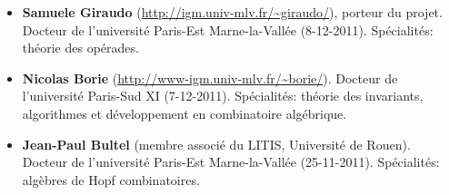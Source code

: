 \documentclass[10pt,reqno]{amsart}
\numberwithin{equation}{subsection}
\begin{document}
\begin{itemize}[fullwidth]
 \item {\bf Samuele Giraudo} (\url{http://igm.univ-mlv.fr/~giraudo/}), porteur du projet. 
  Docteur de l'université Paris-Est Marne-la-Vallée (8-12-2011).
  Spécialités: théorie des opérades.


\item {\bf Nicolas Borie} (\url{http://www-igm.univ-mlv.fr/~borie/}).
 Docteur de l'université Paris-Sud XI (7-12-2011).
 Spécialités: théorie des invariants, algorithmes et développement en combinatoire algébrique.


\item {\bf Jean-Paul Bultel} (membre associé du LITIS, Université de Rouen).
Docteur de l'université Paris-Est Marne-la-Vallée (25-11-2011).
Spécialités: algèbres de Hopf combinatoires.


\end{itemize}
\end{document}
